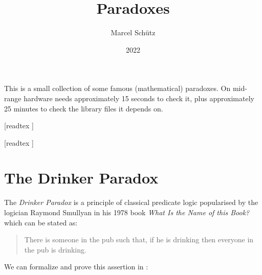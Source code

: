 \documentclass{article}
\title{Paradoxes}
\author{Marcel Schütz}
\date{2022}
\begin{document}
  \maketitle

  \noindent This is a small collection of some famous (mathematical) paradoxes.
  On mid-range hardware \Naproche needs approximately 15 seconds to check it,
  plus approximately 25 minutes to check the library files it depends on.

  \begin{forthel}

    [readtex ]

    [readtex ]
  \end{forthel}


  \section*{The Drinker Paradox}

  The \emph{Drinker Paradox} is a principle of classical predicate logic
  popularised by the logician Raymond Smullyan in his 1978 book \textit{What Is
  the Name of this Book?} which can be stated as:

  \begin{quotation}
    \noindent There is someone in the pub such that, if he is drinking then
    everyone in the pub is drinking.
  \end{quotation}

  \noindent We can formalize and prove this assertion in \Naproche:
\end{document}

